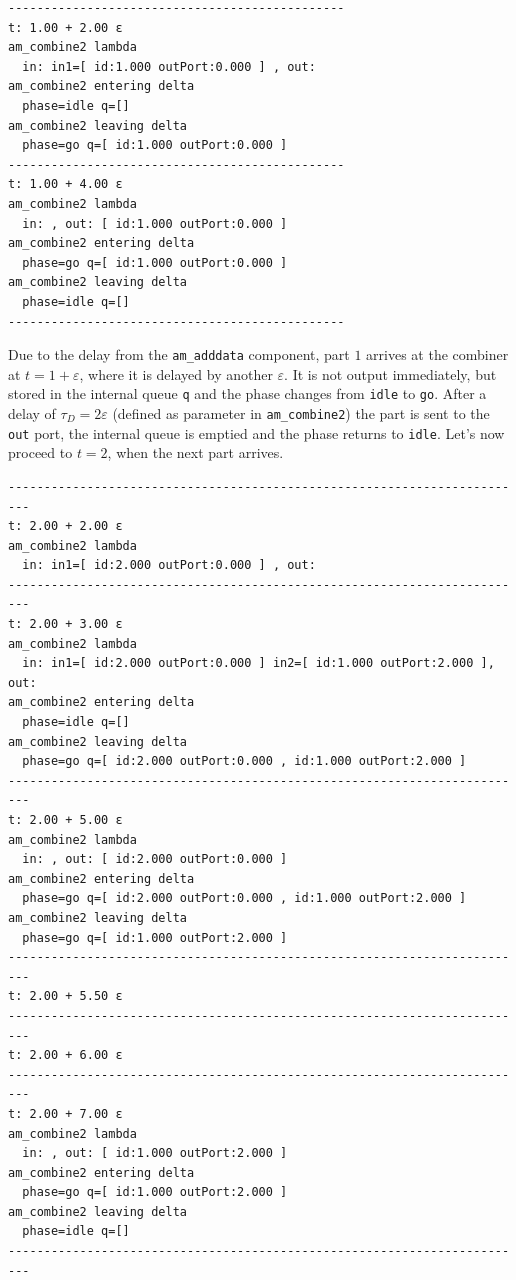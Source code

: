 \documentclass[12pt,oneside,a4paper,bibtotoc,BCOR=0pt,DIV=20]{scrreprt}
\newcommand{\cft}[1]{\mbox{\texttt{#1}}}   %
\newcommand{\epsi}{\varepsilon}
\begin{document}
\begin{verbatim}
-----------------------------------------------
t: 1.00 + 2.00 ε
am_combine2 lambda
  in: in1=[ id:1.000 outPort:0.000 ] , out: 
am_combine2 entering delta
  phase=idle q=[] 
am_combine2 leaving delta
  phase=go q=[ id:1.000 outPort:0.000 ]
-----------------------------------------------
t: 1.00 + 4.00 ε
am_combine2 lambda
  in: , out: [ id:1.000 outPort:0.000 ]
am_combine2 entering delta
  phase=go q=[ id:1.000 outPort:0.000 ]
am_combine2 leaving delta
  phase=idle q=[]
-----------------------------------------------
\end{verbatim}

Due to the delay from the \cft{am\_adddata} component, part $1$ arrives at the
combiner at $t = 1 + \epsi$, where it is delayed by another $\epsi$. It is not
output immediately, but stored in the internal queue \cft{q} and the phase
changes from \cft{idle} to \cft{go}. After a delay of $\tau_D = 2\epsi$
(defined as parameter in \cft{am\_combine2}) the part is sent to the \cft{out}
port, the internal queue is emptied and the phase returns to \cft{idle}. Let's
now proceed to $t = 2$, when the next part arrives.


\begin{verbatim}
-------------------------------------------------------------------------
t: 2.00 + 2.00 ε
am_combine2 lambda
  in: in1=[ id:2.000 outPort:0.000 ] , out: 
-------------------------------------------------------------------------
t: 2.00 + 3.00 ε
am_combine2 lambda
  in: in1=[ id:2.000 outPort:0.000 ] in2=[ id:1.000 outPort:2.000 ], out:
am_combine2 entering delta
  phase=idle q=[] 
am_combine2 leaving delta
  phase=go q=[ id:2.000 outPort:0.000 , id:1.000 outPort:2.000 ]
-------------------------------------------------------------------------
t: 2.00 + 5.00 ε
am_combine2 lambda
  in: , out: [ id:2.000 outPort:0.000 ]
am_combine2 entering delta
  phase=go q=[ id:2.000 outPort:0.000 , id:1.000 outPort:2.000 ]
am_combine2 leaving delta
  phase=go q=[ id:1.000 outPort:2.000 ]
-------------------------------------------------------------------------
t: 2.00 + 5.50 ε
-------------------------------------------------------------------------
t: 2.00 + 6.00 ε
-------------------------------------------------------------------------
t: 2.00 + 7.00 ε
am_combine2 lambda
  in: , out: [ id:1.000 outPort:2.000 ]
am_combine2 entering delta
  phase=go q=[ id:1.000 outPort:2.000 ]
am_combine2 leaving delta
  phase=idle q=[] 
-------------------------------------------------------------------------
\end{verbatim}
\end{document}
